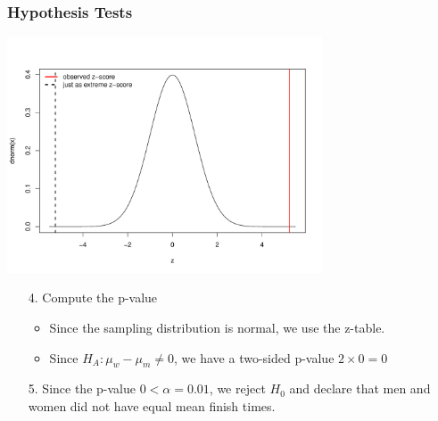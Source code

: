 \documentclass[slides]{beamer}
\begin{document}
\begin{frame}[fragile]
\frametitle{Hypothesis Tests}
\begin{center}
\includegraphics[width=0.7\textwidth]{pvalue.pdf}
\end{center}

\begin{enumerate}
\pause \item[4.] Compute the p-value
\begin{itemize}
\item Since the sampling distribution is normal, we use the z-table.
\item Since $H_A:  \mu_w - \mu_m \neq 0$, we have a two-sided p-value $2 \times 0 = 0$
\end{itemize}
\pause \item[5.] Since the p-value $0 < \alpha=0.01$, we reject $H_0$ and declare that men and women did not have equal mean finish times.  
\end{enumerate}





\end{frame}
\end{document}
